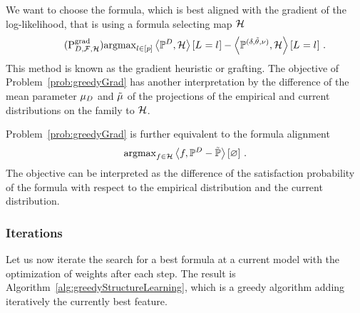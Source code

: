 We want to choose the formula, which is best aligned with the gradient of the log-likelihood, that is using a formula selecting map $\mathcal{H}$
\begin{align} \label{prob:greedyGrad} \tag{$\mathrm{P}^{\mathrm{grad}}_{\datamap,\formulaset,\fselectionmap}$} 
	\argmax_{\selindex\in[\seldim]} \sbcontractionof{\empdistribution,\fselectionmap}{\indexedselvariable} 
	- \sbcontractionof{\expdistof{(\naivestat, \naivecanparam, \basemeasure)},\fselectionmap}{\indexedselvariable} \, . 
\end{align}
This method is known as the gradient heuristic or grafting.
The objective of Problem~\eqref{prob:greedyGrad} has another interpretation by the difference of the mean parameter $\mu_{D}$ and $\tilde{\mu}$ of the projections of the empirical and current distributions on the family to $\mathcal{H}$. %

Problem~\eqref{prob:greedyGrad} is further equivalent to the formula alignment
\begin{align*}
	\mathrm{argmax}_{f\in\mathcal{H}} \left\langle f,\mathbb{P}^{D}-\tilde{\mathbb{P}}\right\rangle \left[ \varnothing \right] \, . 
\end{align*}
The objective can be interpreted as the difference of the satisfaction probability of the formula with respect to the empirical distribution and the current distribution.












\subsubsection{Iterations}

Let us now iterate the search for a best formula at a current model with the optimization of weights after each step.
The result is Algorithm~\ref{alg:greedyStructureLearning}, which is a greedy algorithm adding iteratively the currently best feature.

